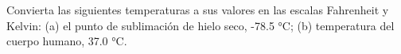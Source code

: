 \item Convierta las siguientes temperaturas a sus valores en las escalas Fahrenheit y Kelvin: (a) el punto de sublimación de hielo seco, -78.5 °C; (b) temperatura del cuerpo humano, 37.0 °C.
